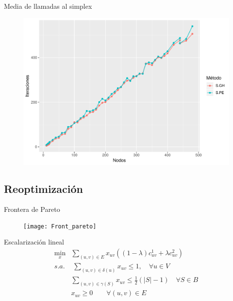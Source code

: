 \documentclass{beamer}
\begin{document}
\begin{frame}{Media de llamadas al simplex}
\begin{figure}[h!]
\centering
\includegraphics[scale=0.45]{plot2}
\end{figure}
\end{frame}

\subsection{Reoptimización}

\begin{frame}{Frontera de Pareto}
\begin{figure}[h!]
\centering
\texttt{[image: Front\_pareto]}
\end{figure}
\end{frame}

\begin{frame}{Escalarización lineal}
\begin{align*}
\min_x & \sum_{(u,v) \in E}x_{uv}((1-\lambda)c^1_{uv}+\lambda c^2_{uv})\\
s.a.&\;\sum_{(u,v)\in\delta(u)} x_{uv} \leq 1, \quad \forall u \in V\\
&\sum_{(u,v)\in \gamma(S)} x_{uv} \leq \frac{1}{2}(|S|-1)\quad \forall S \in B	\\
&x_{uv} \geq 0 \qquad \forall(u,v)\in E
\end{align*}
\end{frame}

\end{document}
